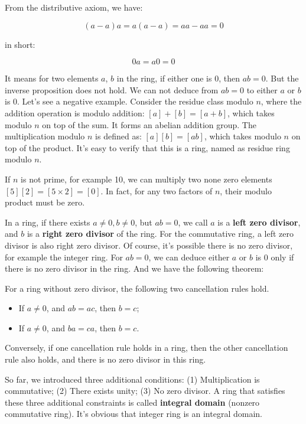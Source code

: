 \documentclass[b5paper]{article}
\begin{document}
From the distributive axiom, we have:

\[
(a - a)a = a(a - a) = aa - aa = 0
\]

in short:

\[
0 a = a 0 = 0
\]

It means for two elements $a$, $b$ in the ring, if either one is 0, then $ab = 0$. But the inverse proposition does not hold. We can not deduce from $ab =0$ to either $a$ or $b$ is 0. Let's see a negative example. Consider the residue class modulo $n$, where the addition operation is modulo addition: $[a] + [b] = [a + b]$, which takes modulo $n$ on top of the sum. It forms an abelian addition group. The multiplication modulo $n$ is defined as: $[a][b] = [ab]$, which takes modulo $n$ on top of the product. It's easy to verify that this is a ring, named as residue ring modulo $n$.

If $n$ is not prime, for example 10, we can multiply two none zero elements $[5][2] = [5 \times 2] = [0]$. In fact, for any two factors of $n$, their modulo product must be zero.

In a ring, if there exists $a \neq 0, b \neq 0$, but $ab = 0$, we call $a$ is a \textbf{left zero divisor}, and $b$ is a \textbf{right zero divisor} of the ring. For the commutative ring, a left zero divisor is also right zero divisor. Of course, it's possible there is no zero divisor, for example the integer ring. For $ab = 0$, we can deduce either $a$ or $b$ is 0 only if there is no zero divisor in the ring. And we have the following theorem:

\begin{theorem}
For a ring without zero divisor, the following two cancellation rules hold.
\begin{itemize}
\item If $a \neq 0$, and $ab = ac$, then $b = c$;
\item If $a \neq 0$, and $ba = ca$, then $b = c$.
\end{itemize}
\end{theorem}

Conversely, if one cancellation rule holds in a ring, then the other cancellation rule also holds, and there is no zero divisor in this ring.

So far, we introduced three additional conditions: (1) Multiplication is commutative; (2) There exists unity; (3) No zero divisor. A ring that satisfies these three additional constraints is called \textbf{integral domain} (nonzero commutative ring). It's obvious that integer ring is an integral domain.
\end{document}
